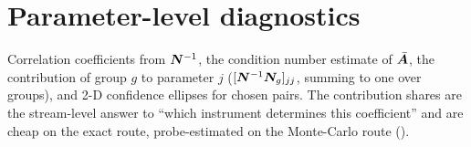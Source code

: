 \section{Parameter-level diagnostics}

Correlation coefficients from $\bm{N}^{-1}$, the condition number estimate of $\bar{\bm{A}}$, the contribution of group $g$ to parameter $j$ ($[\bm{N}^{-1}\bm{N}_g]_{jj}$, summing to one over groups), and 2-D confidence ellipses for chosen pairs. The contribution shares are the stream-level answer to ``which instrument determines this coefficient'' and are cheap on the exact route, probe-estimated on the Monte-Carlo route ().
